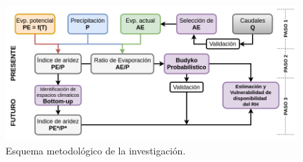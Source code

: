 \vspace{.25cm}
\begin{figure}[ht]
	\includegraphics[scale=0.49]{Images/workflow.png}
	\centering
	\caption{Esquema metodológico de la investigación.}
	\label{fig:workflow}
\end{figure}